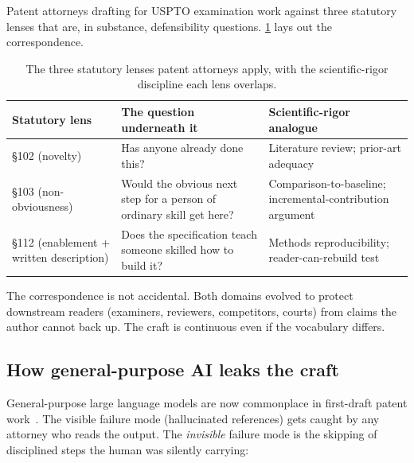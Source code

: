 \documentclass[11pt,letterpaper]{article}
\begin{document}
Patent attorneys drafting for USPTO examination work against three
statutory lenses that are, in substance, defensibility questions.
\cref{tab:statutes} lays out the correspondence.

\begin{table}[h]
\centering
\small
\begin{tabularx}{\linewidth}{@{}l X X@{}}
\toprule
\textbf{Statutory lens} & \textbf{The question underneath it} & \textbf{Scientific-rigor analogue} \\
\midrule
\S102 (novelty)       & Has anyone already done this?                                   & Literature review; prior-art adequacy \\
\S103 (non-obviousness)& Would the obvious next step for a person of ordinary skill get here? & Comparison-to-baseline; incremental-contribution argument \\
\S112 (enablement + written description) & Does the specification teach someone skilled how to build it? & Methods reproducibility; reader-can-rebuild test \\
\bottomrule
\end{tabularx}
\caption{The three statutory lenses patent attorneys apply, with the
scientific-rigor discipline each lens overlaps.}
\label{tab:statutes}
\end{table}

The correspondence is not accidental. Both domains evolved to protect
downstream readers (examiners, reviewers, competitors, courts) from
claims the author cannot back up. The craft is continuous even if the
vocabulary differs.

\subsection{How general-purpose AI leaks the craft}

General-purpose large language models are now commonplace in
first-draft patent work~\citep{ipwatchdog2024,patentlyo2024}. The
visible failure mode (hallucinated references) gets caught by any
attorney who reads the output. The \emph{invisible} failure mode is
the skipping of disciplined steps the human was silently carrying:
\end{document}
